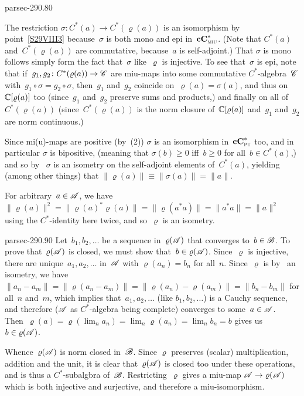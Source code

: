 \documentclass[b5page]{book}
\begin{document}
\begin{solution}{parsec-290.80}
\begin{enumerate}
The restriction $\sigma\colon C^*(a)\to C^*(\varrho(a))$
is an isomorphism by point~\ref{S29VIII3} because~$\sigma$
is both mono and epi in~$\mathbf{cC}^*_{\text{\textsc{miu}}}$.
(Note that $C^*(a)$ and~$C^*(\varrho(a))$ are commutative,
because~$a$ is self-adjoint.)
That $\sigma$ is mono follows simply form the fact
that~$\sigma$ like~$\varrho$ is injective.
To see that~$\sigma$ is epi,
note that if~$g_1,g_2\colon C^*(\varrho(a))\to\mathscr{C}$
are miu-maps into some commutative $C^*$-algebra~$\mathscr{C}$
with~$g_1\circ \sigma = g_2\circ \sigma$,
then~$g_1$ and~$g_2$ coincide on~$\varrho(a)=\sigma(a)$,
and thus
on~$\mathbb{C}[\varrho(a)]$ too (since~$g_1$ and~$g_2$ preserve sums and products,)
and finally on all of~$C^*(\varrho(a))$
(since~$C^*(\varrho(a))$ is
the norm closure of~$\mathbb{C}[\varrho(a)]$
and~$g_1$ and~$g_2$ are norm continuous.)

Since mi(u)-maps are positive (by~(2))
$\sigma$ is an isomorphism in~$\mathbf{cC}^*_{\text{\textsc{pu}}}$ too,
and in particular $\sigma$ is bipositive,
(meaning that $\sigma(b)\geq 0$ iff~$b\geq 0$ for all~$b\in C^*(a)$,)
and so by~
$\sigma$ is an isometry on the self-adjoint elements
of~$C^*(a)$, yielding (among other things) that
$\|\varrho(a)\|\equiv\|\sigma(a)\|= \|a\|$.

For arbitrary~$a\in \mathscr{A}$,
we have
$\|\varrho(a)\|^2
= \|\varrho(a)^* \varrho(a)\|
= \|\varrho(a^*a)\|=\|a^*a\|=\|a\|^2$
using the $C^*$-identity here twice,
and so~$\varrho$ is an isometry.
\end{enumerate}
\end{solution}
\begin{solution}{parsec-290.90}
Let~$b_1,b_2,\dotsc$ be a sequence in~$\varrho(\mathscr{A})$
that converges to~$b\in \mathscr{B}$. 
To prove that~$\varrho(\mathscr{A})$ is closed,
we must show that~$b\in \varrho(\mathscr{A})$.
Since~$\varrho$ is injective,
there are unique~$a_1,a_2,\dotsc$ in~$\mathscr{A}$ with
$\varrho(a_n)=b_n$ for all~$n$.
Since~$\varrho$ is by~
 an isometry,
we have $\|a_n-a_m\|=\|\varrho(a_n - a_m)\|
= \|\varrho(a_n)-\varrho(a_m)\|= \|b_n-b_m\|$
for all~$n$ and~$m$,
which implies that~$a_1,a_2,\dotsc$
(like $b_1,b_2,\dotsc$) is a Cauchy sequence,
and therefore ($\mathscr{A}$ as $C^*$-algebra being complete)
converges to some~$a\in\mathscr{A}$.
Then~$\varrho(a)=\varrho(\lim_n a_n)=
\lim_n \varrho(a_n)=\lim_n b_n=b$
gives us~$b\in \varrho(\mathscr{A})$.

Whence~$\varrho(\mathscr{A})$ is norm closed in~$\mathscr{B}$.
Since $\varrho$ preserves (scalar) multiplication, addition and the unit,
it is clear that~$\varrho(\mathscr{A})$ is closed too
under these operations,
and is thus a $C^*$-subalgbra of~$\mathscr{B}$.
Restricting~$\varrho$ gives a miu-map $\mathscr{A}\to\varrho(\mathscr{A})$
which is both injective and surjective, and therefore a miu-isomorphism.
\end{solution}
\end{document}
